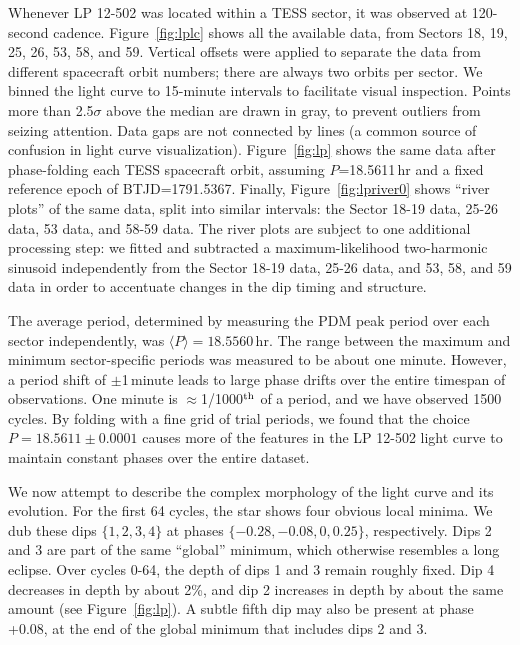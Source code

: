 \documentclass[11pt,twocolumn,tighten]{aastex63}
\begin{document}
Whenever LP 12-502 was located within a TESS sector, it was observed
at 120-second cadence.  Figure~\ref{fig:lplc} shows all the available
data, from Sectors 18, 19, 25, 26, 53, 58, and 59. Vertical offsets
were applied to separate the data from different spacecraft orbit
numbers; there are always two orbits per sector.  We binned the light
curve to 15-minute intervals to facilitate visual inspection.  Points
more than 2.5$\sigma$ above the median are drawn in gray, to prevent
outliers from seizing attention.  Data gaps are not connected by lines
(a common source of confusion in light curve visualization).
Figure~\ref{fig:lp} shows the same data after phase-folding each TESS
spacecraft orbit, assuming $P$=18.5611\,hr and a fixed reference epoch
of BTJD=1791.5367.  Finally, Figure~\ref{fig:lpriver0} shows ``river
plots'' of the same data, split into similar intervals: the Sector
18-19 data, 25-26 data, 53 data, and 58-59 data.  The river plots are
subject to one additional processing step: we fitted and subtracted a
maximum-likelihood two-harmonic sinusoid independently from the Sector
18-19 data, 25-26 data, and 53, 58, and 59 data in order to accentuate
changes in the dip timing and structure.

The average period, determined by measuring the PDM peak period over
each sector independently, was $\langle P \rangle = 18.5560$\,hr.  The
range between the maximum and minimum sector-specific periods was
measured to be about one minute.   However, a period shift of
$\pm$1\,minute leads to large phase drifts over the entire timespan of
observations.  One minute is $\approx$1/1000$^{\rm th}$ of a period,
and we have observed 1500 cycles.  By folding with a fine grid of
trial periods, we found that the choice $P=18.5611 \pm 0.0001$ causes
more of the features in the LP 12-502 light curve to maintain constant
phases over the entire dataset.

We now attempt to describe the complex morphology of the light curve
and its evolution.  For the first 64 cycles, the star shows four
obvious local minima.  We dub these dips $\{ 1, 2, 3, 4 \}$ at phases
$\{ -0.28, -0.08, 0, 0.25 \}$, respectively.  Dips 2 and 3 are part of
the same ``global'' minimum, which otherwise resembles a long eclipse.
Over cycles 0-64, the depth of dips 1 and 3 remain roughly fixed.  Dip
4 decreases in depth by about 2\%, and dip 2 increases in depth by
about the same amount (see Figure~\ref{fig:lp}).  A subtle fifth dip
may also be present at phase +0.08, at the end of the global minimum
that includes dips 2 and 3.
\end{document}
